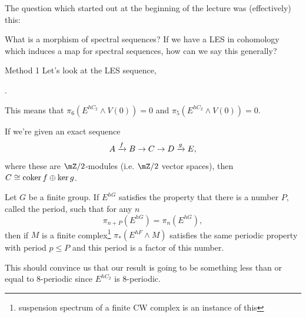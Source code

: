 The question which started out at the beginning of the lecture was (effectively) this: 
\begin{question}{}{}
    What is a morphism of spectral sequences? If we have a LES in cohomology which induces a map for spectral sequences, how can we say this generally?
\end{question}

\begin{remark}{Method 1}{}
    Let's look at the LES sequence, 
    \begin{center}
      .
    \end{center}
    This means that $\pi_6(E^{hC_2}\wedge V(0)) = 0$ and $\pi_5(E^{hC_2}\wedge V(0))=0.$
\end{remark}

\begin{fact}{}{}
    If we're given an exact sequence $$A\xrightarrow{f}B\to C\to D\xrightarrow{g}E,$$ where these are $\mZ/2$-modules (i.e. $\mZ/2$ vector spaces), then $C\cong \operatorname{\text{coker}} f\oplus \ker g$. 
\end{fact}

\begin{theorem}{}{}
    Let $G$ be a finite group. If $E^{hG}$ satisfies the property that there is a number $P$, called the period, such that for any $n$ $$\pi_{n+P}(E^{hG}) = \pi_{n}(E^{hG}),$$ then if $M$ is a finite complex\footnote{suspension spectrum of a finite CW complex is an instance of this} $\pi_\ast(E^{hF}\wedge M)$ satisfies the same periodic property with period $p\leq P$ and this period is a factor of this number. 
\end{theorem}
This should convince us that our result is going to be something less than or equal to 8-periodic since $E^{hC_2}$ is 8-periodic. 
 

